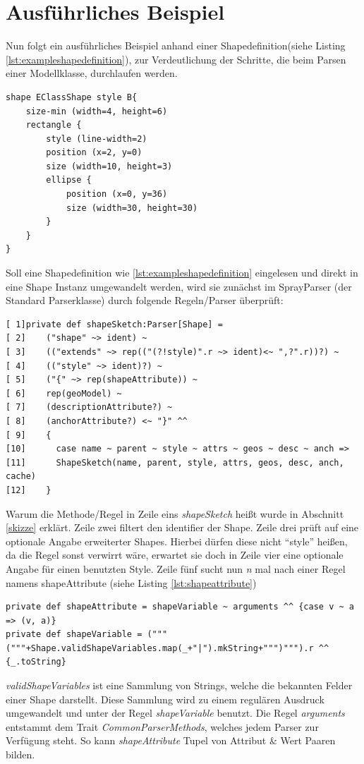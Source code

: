 \section{Ausführliches Beispiel}\label{example}
Nun folgt ein ausführliches Beispiel anhand einer Shapedefinition(siehe Listing \ref{lst:exampleshapedefinition}), zur Verdeutlichung der Schritte, die beim Parsen einer Modellklasse, durchlaufen werden.
\begin{lstlisting}[style=spray, caption = {Beispieldefinition für eine Shape}, label = {lst:exampleshapedefinition}]
shape EClassShape style B{
    size-min (width=4, height=6)
    rectangle {
        style (line-width=2)
        position (x=2, y=0)
        size (width=10, height=3)
        ellipse {
            position (x=0, y=36)
            size (width=30, height=30)
        }
    }
}
\end{lstlisting}Soll eine Shapedefinition wie \ref{lst:exampleshapedefinition} eingelesen und direkt in eine Shape Instanz umgewandelt werden, wird sie zunächst im SprayParser (der Standard Parserklasse) durch folgende Regeln/Parser überprüft:
\begin{lstlisting}[style=scala, caption = {Methode zum Parsen einer Shape(Sketch)}, label = {lst:defshapesketch}]
[ 1]private def shapeSketch:Parser[Shape] =
[ 2]    ("shape" ~> ident) ~
[ 3]    (("extends" ~> rep(("(?!style)".r ~> ident)<~ ",?".r))?) ~
[ 4]    (("style" ~> ident)?) ~
[ 5]    ("{" ~> rep(shapeAttribute)) ~
[ 6]    rep(geoModel) ~
[ 7]    (descriptionAttribute?) ~
[ 8]    (anchorAttribute?) <~ "}" ^^
[ 9]    {
[10]      case name ~ parent ~ style ~ attrs ~ geos ~ desc ~ anch =>
[11]      ShapeSketch(name, parent, style, attrs, geos, desc, anch, cache) 
[12]    }
\end{lstlisting}Warum die Methode/Regel in Zeile eins \textit{shapeSketch} heißt wurde in Abschnitt \ref{skizze} erklärt. Zeile zwei filtert den identifier der Shape. Zeile drei prüft auf eine optionale Angabe erweiterter Shapes. Hierbei dürfen diese nicht "`style"' heißen, da die Regel sonst verwirrt wäre, erwartet sie doch in Zeile vier eine optionale Angabe für einen benutzten Style. Zeile fünf sucht nun \textit{n} mal nach einer Regel namens shapeAttribute (siehe Listing \ref{lst:shapeattribute})
\begin{lstlisting}[style=scala, caption = {Regeln zum Parsen der Felder}, label = {lst:shapeattribute}]
private def shapeAttribute = shapeVariable ~ arguments ^^ {case v ~ a => (v, a)}
private def shapeVariable = ("""("""+Shape.validShapeVariables.map(_+"|").mkString+""")""").r ^^ {_.toString}
\end{lstlisting}\textit{validShapeVariables} ist eine Sammlung von Strings, welche die bekannten Felder einer Shape darstellt. Diese Sammlung wird zu einem regulären Ausdruck umgewandelt und unter der Regel \textit{shapeVariable} benutzt. Die Regel \textit{arguments} entstammt dem Trait \textit{CommonParserMethods}, welches jedem Parser zur Verfügung steht. So kann \textit{shapeAttribute} Tupel von Attribut \& Wert Paaren bilden. 
